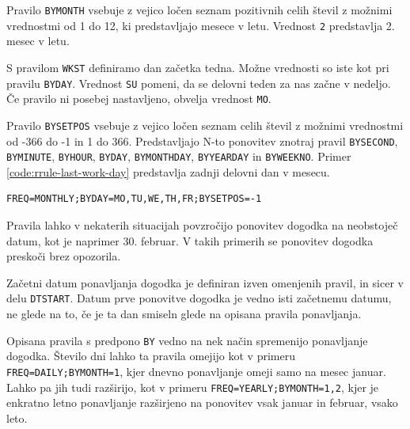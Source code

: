 Pravilo \texttt{BYMONTH} vsebuje z vejico ločen seznam pozitivnih celih števil z možnimi vrednostmi od 1 do 12, ki predstavljajo mesece v letu. Vrednost \texttt{2} predstavlja 2. mesec v letu.

S pravilom \texttt{WKST} definiramo dan začetka tedna. Možne vrednosti so iste kot pri pravilu \texttt{BYDAY}. Vrednost \texttt{SU} pomeni, da se delovni teden za nas začne v nedeljo. Če pravilo ni posebej nastavljeno, obvelja vrednost \texttt{MO}.

Pravilo \texttt{BYSETPOS} vsebuje z vejico ločen seznam celih števil z možnimi vrednostmi od -366 do -1 in 1 do 366. Predstavljajo N-to ponovitev znotraj pravil \texttt{BYSECOND}, \texttt{BYMINUTE}, \texttt{BYHOUR}, \texttt{BYDAY}, \texttt{BYMONTHDAY}, \texttt{BYYEARDAY} in \texttt{BYWEEKNO}. Primer \ref{code:rrule-last-work-day} predstavlja zadnji delovni dan v mesecu.

\begin{lstlisting}[caption=Primer uporabe pravila za zadnji delovni dan v mesecu., label=code:rrule-last-work-day]
FREQ=MONTHLY;BYDAY=MO,TU,WE,TH,FR;BYSETPOS=-1
\end{lstlisting}

Pravila lahko v nekaterih situacijah povzročijo ponovitev dogodka na neobstoječ datum, kot je naprimer 30. februar. V takih primerih se ponovitev dogodka preskoči brez opozorila.

Začetni datum ponavljanja dogodka je definiran izven omenjenih pravil, in sicer v delu \texttt{DTSTART}. Datum prve ponovitve dogodka je vedno isti začetnemu datumu, ne glede na to, če je ta dan smiseln glede na opisana pravila ponavljanja.

Opisana pravila s predpono \texttt{BY} vedno na nek način spremenijo ponavljanje dogodka. Število dni lahko ta pravila omejijo kot v primeru \texttt{FREQ=DAILY;BYMONTH=1}, kjer dnevno ponavljanje omeji samo na mesec januar. Lahko pa jih tudi razširijo, kot v primeru \texttt{FREQ=YEARLY;BYMONTH=1,2}, kjer je enkratno letno ponavljanje razširjeno na ponovitev vsak januar in februar, vsako leto.

